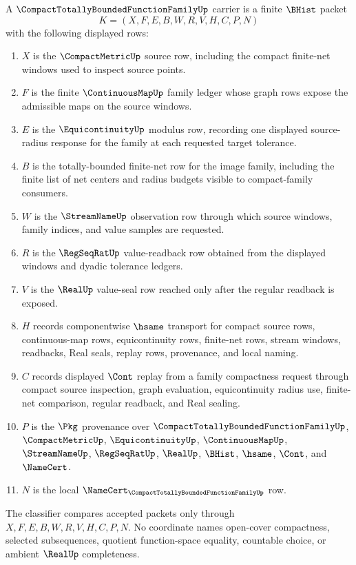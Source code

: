 \begin{definition}
\label{def:compact-totally-bounded-function-family-carrier}
A $\CompactTotallyBoundedFunctionFamilyUp$ carrier is a finite $\BHist$ packet
$$
K=(X,F,E,B,W,R,V,H,C,P,N)
$$
with the following displayed rows:
\begin{enumerate}
\item $X$ is the $\CompactMetricUp$ source row, including the compact finite-net windows used to inspect source points.
\item $F$ is the finite $\ContinuousMapUp$ family ledger whose graph rows expose the admissible maps on the source windows.
\item $E$ is the $\EquicontinuityUp$ modulus row, recording one displayed source-radius response for the family at each requested target tolerance.
\item $B$ is the totally-bounded finite-net row for the image family, including the finite list of net centers and radius budgets visible to compact-family consumers.
\item $W$ is the $\StreamNameUp$ observation row through which source windows, family indices, and value samples are requested.
\item $R$ is the $\RegSeqRatUp$ value-readback row obtained from the displayed windows and dyadic tolerance ledgers.
\item $V$ is the $\RealUp$ value-seal row reached only after the regular readback is exposed.
\item $H$ records componentwise $\hsame$ transport for compact source rows, continuous-map rows, equicontinuity rows, finite-net rows, stream windows, readbacks, Real seals, replay rows, provenance, and local naming.
\item $C$ records displayed $\Cont$ replay from a family compactness request through compact source inspection, graph evaluation, equicontinuity radius use, finite-net comparison, regular readback, and Real sealing.
\item $P$ is the $\Pkg$ provenance over $\CompactTotallyBoundedFunctionFamilyUp$, $\CompactMetricUp$, $\EquicontinuityUp$, $\ContinuousMapUp$, $\StreamNameUp$, $\RegSeqRatUp$, $\RealUp$, $\BHist$, $\hsame$, $\Cont$, and $\NameCert$.
\item $N$ is the local $\NameCert_{\CompactTotallyBoundedFunctionFamilyUp}$ row.
\end{enumerate}
The classifier compares accepted packets only through $X,F,E,B,W,R,V,H,C,P,N$. No coordinate names open-cover compactness, selected subsequences, quotient function-space equality, countable choice, or ambient $\RealUp$ completeness.
\end{definition}

